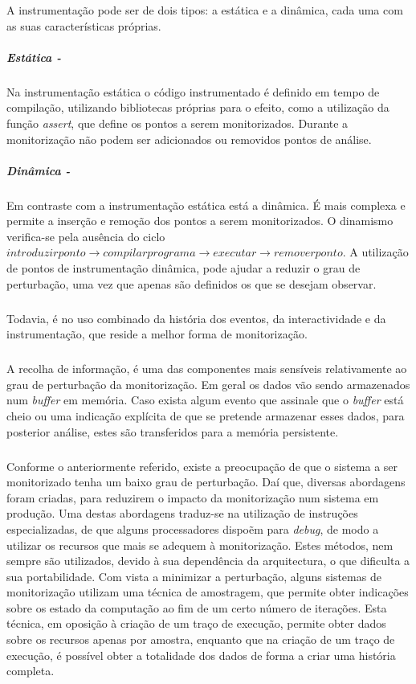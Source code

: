 \begin{itemize}
A instrumentação pode ser de dois tipos: a estática e a dinâmica, cada uma com as suas características próprias.

\subparagraph*{Estática - }

Na instrumentação estática o código instrumentado é definido em tempo de compilação, utilizando bibliotecas próprias para o efeito, como a utilização da função \textit{assert}, que define os pontos a serem monitorizados.
Durante a monitorização não podem ser adicionados ou removidos pontos de análise.

\subparagraph*{Dinâmica - }

Em contraste com a instrumentação estática está a dinâmica.
É mais complexa e permite a inserção e remoção dos pontos a serem monitorizados.
O dinamismo verifica-se pela ausência do ciclo $introduzir ponto\rightarrow compilar programa\rightarrow executar\rightarrow remover ponto$.
A utilização de pontos de instrumentação dinâmica, pode ajudar a reduzir o grau de perturbação, uma vez que apenas são definidos os que se desejam observar.
\end{itemize}

\subparagraph*{}
Todavia, é no uso combinado da história dos eventos, da interactividade e da instrumentação, que reside a melhor forma de monitorização.

\subparagraph*{
}
A recolha de informação, é uma das componentes mais sensíveis relativamente ao grau de perturbação da monitorização.
Em geral os dados vão sendo armazenados num \textit{buffer} em memória.
Caso exista algum evento que assinale que o \textit{buffer} está cheio ou uma indicação explícita de que se pretende armazenar esses dados, para posterior análise, estes são transferidos para a memória persistente.

\subparagraph*{
}
Conforme o anteriormente referido, existe a preocupação de que o sistema a ser monitorizado tenha um baixo grau de perturbação.
Daí que, diversas abordagens foram criadas, para reduzirem o impacto da monitorização num sistema em produção.
Uma destas abordagens traduz-se na utilização de instruções especializadas, de que alguns processadores dispoẽm para \textit{debug}, de modo a utilizar os recursos que mais se adequem à monitorização.
Estes métodos, nem sempre são utilizados, devido à sua dependência da arquitectura, o que dificulta a sua portabilidade.
Com vista a minimizar a perturbação, alguns sistemas de monitorização utilizam uma técnica de amostragem, que permite obter indicações sobre os estado da computação ao fim de um certo número de iterações.
Esta técnica, em oposição à criação de um traço de execução, permite obter dados sobre os recursos apenas por amostra, enquanto que na criação de um traço de execução, é possível obter a totalidade dos dados de forma a criar uma história completa.

